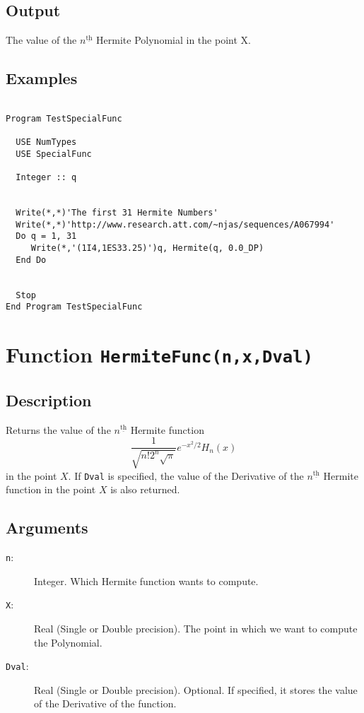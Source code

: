 \subsection{Output}

The value of the $n^{\underline{\text{th}}}$ Hermite Polynomial in
the point X.

\subsection{Examples}

\begin{verbatim}

Program TestSpecialFunc

  USE NumTypes
  USE SpecialFunc

  Integer :: q


  Write(*,*)'The first 31 Hermite Numbers'
  Write(*,*)'http://www.research.att.com/~njas/sequences/A067994'
  Do q = 1, 31
     Write(*,'(1I4,1ES33.25)')q, Hermite(q, 0.0_DP)
  End Do


  Stop
End Program TestSpecialFunc
\end{verbatim}

\section{Function \texttt{HermiteFunc(n,x,Dval)}}

\subsection{Description}

Returns the value of the $n^{\underline{\text{th}}}$ Hermite
function
\begin{equation}
  \frac{1}{\sqrt{n!2^n\sqrt{\pi}}}e^{-x^2/2}H_n(x)
\end{equation}
in the point $X$. If \texttt{Dval} is specified, the value
of the Derivative of the $n^{\underline{\text{th}}}$ Hermite
function in the point $X$ is also returned.

\subsection{Arguments}

\begin{description}
\item[\texttt{n}:] Integer. Which Hermite function wants to compute.
\item[\texttt{X}:] Real (Single or Double precision). The point in
  which we want to compute the Polynomial.
\item[\texttt{Dval}:] Real (Single or Double precision). Optional. If
  specified, it stores the value of the Derivative of the
  function.
\end{description}

